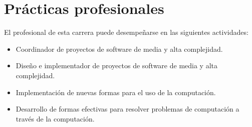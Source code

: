 \section{Prácticas profesionales}
El profesional de esta carrera puede desempeñarse en las siguientes actividades:
\begin{itemize}
\item Coordinador de proyectos de software de media y alta complejidad.

\item Diseño e implementador de proyectos de software de media y alta complejidad.

\item Implementación de nuevas formas para el uso de la computación.

\item Desarrollo de formas efectivas para resolver problemas de computación a través de la computación.
\end{itemize}
